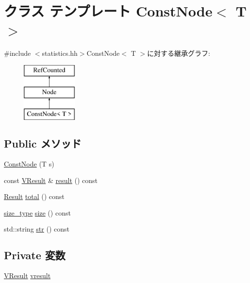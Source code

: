 \hypertarget{classStats_1_1ConstNode}{
\section{クラス テンプレート ConstNode$<$ T $>$}
\label{classStats_1_1ConstNode}
}


{\ttfamily \#include $<$statistics.hh$>$}ConstNode$<$ T $>$に対する継承グラフ:\begin{figure}[H]
\begin{center}
\leavevmode
\includegraphics[height=3cm]{classStats_1_1ConstNode}
\end{center}
\end{figure}
\subsection*{Public メソッド}
\begin{DoxyCompactItemize}
\item 
\hyperlink{classStats_1_1ConstNode_a215ea66be073f183a06875674898b1cd}{ConstNode} (T s)
\item 
const \hyperlink{classstd_1_1vector}{VResult} \& \hyperlink{classStats_1_1ConstNode_aba312f9e3431b1652f8b3ddf3fe105dc}{result} () const 
\item 
\hyperlink{namespaceStats_ad874d2cfd4b4a29ebd480bb2e67f20ae}{Result} \hyperlink{classStats_1_1ConstNode_a35c6e2ed3fc81b40d69052a062113ead}{total} () const 
\item 
\hyperlink{namespaceStats_ada51e68d31936547d3729c82daf6b7c6}{size\_\-type} \hyperlink{classStats_1_1ConstNode_a503ab01f6c0142145d3434f6924714e7}{size} () const 
\item 
std::string \hyperlink{classStats_1_1ConstNode_a1b9b8885b0880fc4ddf9a2c7d1ca3dc4}{str} () const 
\end{DoxyCompactItemize}
\subsection*{Private 変数}
\begin{DoxyCompactItemize}
\item 
\hyperlink{classstd_1_1vector}{VResult} \hyperlink{classStats_1_1ConstNode_a8f41af856442757ec68f3391333d3eb2}{vresult}
\end{DoxyCompactItemize}
